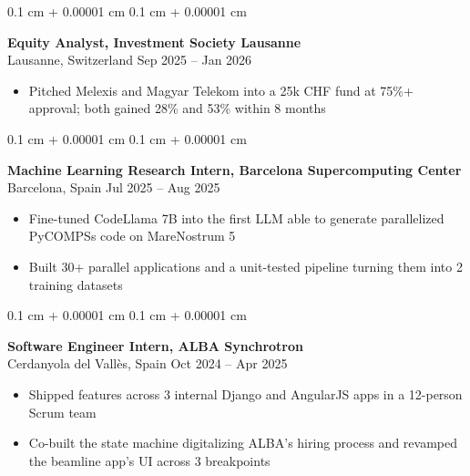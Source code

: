 \documentclass[10pt, letterpaper]{article}
\newenvironment{highlights}{
    \begin{itemize}[
        topsep=0.06 cm,
        parsep=0.06 cm,
        partopsep=0pt,
        itemsep=0pt,
        leftmargin=10pt
    ]
}{
    \end{itemize}
} %
\newenvironment{onecolentry}{
    \begin{adjustwidth}{
        0.1 cm + 0.00001 cm
    }{
        0.1 cm + 0.00001 cm
    }
}{
    \end{adjustwidth}
} %
\newenvironment{entry}{
    \begin{onecolentry}
}{
    \end{onecolentry}
} %
\newcommand{\locsep}{\quad\textbar\quad}
\begin{document}
        \vspace{0.13 cm}

        \begin{entry}
            \textbf{Equity Analyst, Investment Society Lausanne} \\
            Lausanne, Switzerland \locsep Sep 2025 -- Jan 2026
            \begin{highlights}
                \item Pitched Melexis and Magyar Telekom into a 25k CHF fund at 75\%+ approval; both gained 28\% and 53\% within 8 months
            \end{highlights}
        \end{entry}

        \vspace{0.13 cm}

        \begin{entry}
            \textbf{Machine Learning Research Intern, Barcelona Supercomputing Center} \\
            Barcelona, Spain \locsep Jul 2025 -- Aug 2025
            \begin{highlights}
                \item Fine-tuned CodeLlama 7B into the first LLM able to generate parallelized PyCOMPSs code on MareNostrum 5
                \item Built 30+ parallel applications and a unit-tested pipeline turning them into 2 training datasets
            \end{highlights}
        \end{entry}

        \vspace{0.13 cm}

        \begin{entry}
            \textbf{Sof{}tware Engineer Intern, ALBA Synchrotron} \\
            Cerdanyola del Vall\`es, Spain \locsep Oct 2024 -- Apr 2025
            \begin{highlights}
                \item Shipped features across 3 internal Django and AngularJS apps in a 12-person Scrum team
                \item Co-built the state machine digitalizing ALBA's hiring process and revamped the beamline app's UI across 3 breakpoints
            \end{highlights}
        \end{entry}
\end{document}
